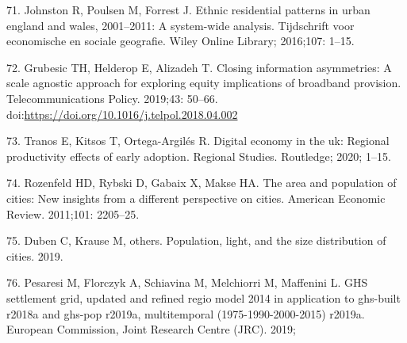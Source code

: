 \documentclass[10pt,letterpaper]{article}
\begin{document}
\leavevmode\hypertarget{ref-johnston2016ethnic}{}%
71. Johnston R, Poulsen M, Forrest J. Ethnic residential patterns in
urban england and wales, 2001--2011: A system-wide analysis. Tijdschrift
voor economische en sociale geografie. Wiley Online Library; 2016;107:
1--15.

\leavevmode\hypertarget{ref-GRUBESIC201950}{}%
72. Grubesic TH, Helderop E, Alizadeh T. Closing information
asymmetries: A scale agnostic approach for exploring equity implications
of broadband provision. Telecommunications Policy. 2019;43: 50--66.
doi:\href{https://doi.org/https://doi.org/10.1016/j.telpol.2018.04.002}{https://doi.org/10.1016/j.telpol.2018.04.002}

\leavevmode\hypertarget{ref-tranos2020digital}{}%
73. Tranos E, Kitsos T, Ortega-Argilés R. Digital economy in the uk:
Regional productivity effects of early adoption. Regional Studies.
Routledge; 2020; 1--15.

\leavevmode\hypertarget{ref-rozenfeld2011area}{}%
74. Rozenfeld HD, Rybski D, Gabaix X, Makse HA. The area and population
of cities: New insights from a different perspective on cities. American
Economic Review. 2011;101: 2205--25.

\leavevmode\hypertarget{ref-duben2019population}{}%
75. Duben C, Krause M, others. Population, light, and the size
distribution of cities. 2019.

\leavevmode\hypertarget{ref-pesaresi2019ghs}{}%
76. Pesaresi M, Florczyk A, Schiavina M, Melchiorri M, Maffenini L. GHS
settlement grid, updated and refined regio model 2014 in application to
ghs-built r2018a and ghs-pop r2019a, multitemporal (1975-1990-2000-2015)
r2019a. European Commission, Joint Research Centre (JRC). 2019;

\nolinenumbers
\end{document}
